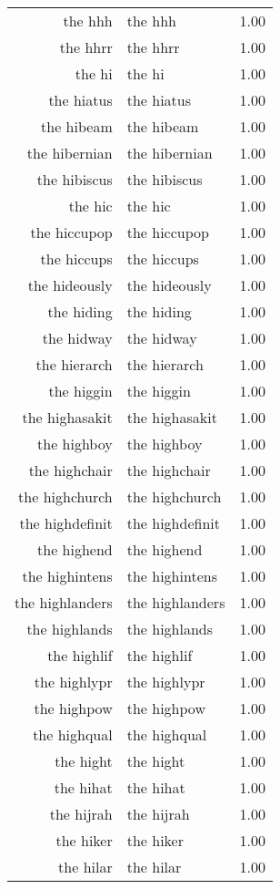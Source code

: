 \begin{table}[ht]
\begin{tabular}{rlr}
  the hhh & the hhh & 1.00 \\ 
  the hhrr & the hhrr & 1.00 \\ 
  the hi & the hi & 1.00 \\ 
  the hiatus & the hiatus & 1.00 \\ 
  the hibeam & the hibeam & 1.00 \\ 
  the hibernian & the hibernian & 1.00 \\ 
  the hibiscus & the hibiscus & 1.00 \\ 
  the hic & the hic & 1.00 \\ 
  the hiccupop & the hiccupop & 1.00 \\ 
  the hiccups & the hiccups & 1.00 \\ 
  the hideously & the hideously & 1.00 \\ 
  the hiding & the hiding & 1.00 \\ 
  the hidway & the hidway & 1.00 \\ 
  the hierarch & the hierarch & 1.00 \\ 
  the higgin & the higgin & 1.00 \\ 
  the highasakit & the highasakit & 1.00 \\ 
  the highboy & the highboy & 1.00 \\ 
  the highchair & the highchair & 1.00 \\ 
  the highchurch & the highchurch & 1.00 \\ 
  the highdefinit & the highdefinit & 1.00 \\ 
  the highend & the highend & 1.00 \\ 
  the highintens & the highintens & 1.00 \\ 
  the highlanders & the highlanders & 1.00 \\ 
  the highlands & the highlands & 1.00 \\ 
  the highlif & the highlif & 1.00 \\ 
  the highlypr & the highlypr & 1.00 \\ 
  the highpow & the highpow & 1.00 \\ 
  the highqual & the highqual & 1.00 \\ 
  the hight & the hight & 1.00 \\ 
  the hihat & the hihat & 1.00 \\ 
  the hijrah & the hijrah & 1.00 \\ 
  the hiker & the hiker & 1.00 \\ 
  the hilar & the hilar & 1.00 \\ 

\end{tabular}
\end{table}
